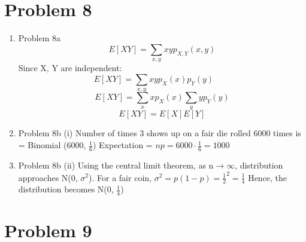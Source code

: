 \documentclass[11pt]{article}
\newcommand{\solution}[1]{{{\color{blue}{\bf Solution:} {#1}}}}
\begin{document}
\newpage
\section{Problem 8}
\begin{enumerate}
\item Problem 8a \newline
\solution{}
$$
	E[XY] = \sum_{x,y} xy p_{X,Y}(x,y)
$$
Since X, Y are independent: 
$$
	E[XY] = \sum_{x,y} xy p_{X}(x) p_{Y}(y) \qquad $$
$$
	E[XY] = \sum_{x} x p_{X}(x) \sum_{y} y p_{Y}(y)
$$
$$
	E[XY] = E[X]E[Y]
$$

\item Problem 8b (i) \newline
\solution{}
Number of times 3 shows up on a fair die rolled 6000 times is = Binomial (6000, $\frac{1}{6}$) \newline
Expectation = $ np = 6000 \cdot \frac{1}{6} = 1000 $

\item Problem 8b (ii) \newline
\solution{}
Using the central limit theorem, as n$\rightarrow \infty$,
distribution approaches N(0, $\sigma^2$). \newline
For a fair coin, $\sigma^2 = p(1 - p) = \frac{1}{2} ^2 = \frac{1}{4}$ \newline
Hence, the distribution becomes N(0, $\frac{1}{4}$)
\end{enumerate}

\newpage
\section{Problem 9}
\end{document}
